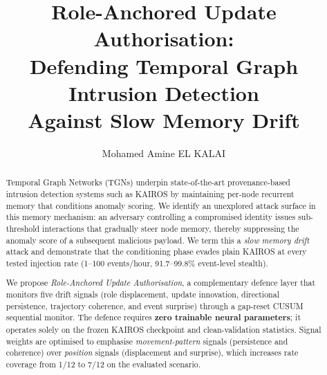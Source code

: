 \documentclass[10pt,twocolumn]{article}
\title{\vspace{-1em}\textbf{Role-Anchored Update Authorisation:\\[2pt]
Defending Temporal Graph Intrusion Detection\\[2pt]
Against Slow Memory Drift}\vspace{-0.6em}}
\author{Mohamed Amine EL KALAI}
\date{}
\begin{document}
\maketitle
\vspace{-1.5em}

\begin{abstract}
Temporal Graph Networks (TGNs) underpin state-of-the-art provenance-based
intrusion detection systems such as KAIROS by maintaining per-node recurrent
memory that conditions anomaly scoring.  We identify an unexplored attack
surface in this memory mechanism: an adversary controlling a compromised
identity issues sub-threshold interactions that gradually steer node memory,
thereby suppressing the anomaly score of a subsequent malicious payload.  We
term this a \emph{slow memory drift} attack and demonstrate that the
conditioning phase evades plain KAIROS at every tested injection rate
(1--100 events/hour, 91.7--99.8\% event-level stealth).

We propose \emph{Role-Anchored Update Authorisation}, a complementary defence
layer that monitors five drift signals (role displacement, update innovation,
directional persistence, trajectory coherence, and event surprise) through a
gap-reset CUSUM sequential monitor.  The defence requires \textbf{zero
trainable neural parameters}; it operates solely on the frozen KAIROS
checkpoint and clean-validation statistics.  Signal weights are optimised
to emphasise \emph{movement-pattern} signals (persistence and coherence)
over \emph{position} signals (displacement and surprise), which increases
rate coverage from 1/12 to 7/12 on the evaluated scenario.


\end{abstract}
\end{document}
